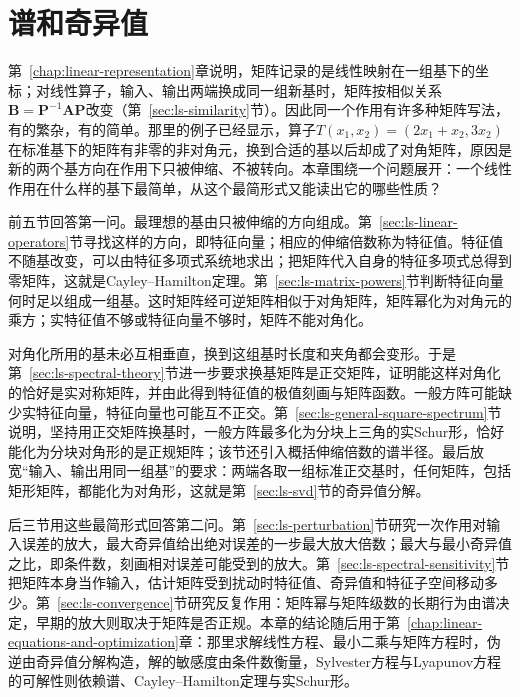 \chapter{谱和奇异值}
\label{chap:linear-analysis}
\label{chap:matrix-analysis}

第~\ref{chap:linear-representation}章说明，矩阵记录的是线性映射在一组基下的坐标；对线性算子，输入、输出两端换成同一组新基时，矩阵按相似关系$\bm B=\bm P^{-1}\bm A\bm P$改变（第~\ref{sec:ls-similarity}节）。因此同一个作用有许多种矩阵写法，有的繁杂，有的简单。那里的例子已经显示，算子$T(x_1,x_2)=(2x_1+x_2,3x_2)$在标准基下的矩阵有非零的非对角元，换到合适的基以后却成了对角矩阵，原因是新的两个基方向在作用下只被伸缩、不被转向。本章围绕一个问题展开：一个线性作用在什么样的基下最简单，从这个最简形式又能读出它的哪些性质？

前五节回答第一问。最理想的基由只被伸缩的方向组成。第~\ref{sec:ls-linear-operators}节寻找这样的方向，即特征向量；相应的伸缩倍数称为特征值。特征值不随基改变，可以由特征多项式系统地求出；把矩阵代入自身的特征多项式总得到零矩阵，这就是Cayley--Hamilton定理。第~\ref{sec:ls-matrix-powers}节判断特征向量何时足以组成一组基。这时矩阵经可逆矩阵相似于对角矩阵，矩阵幂化为对角元的乘方；实特征值不够或特征向量不够时，矩阵不能对角化。

对角化所用的基未必互相垂直，换到这组基时长度和夹角都会变形。于是第~\ref{sec:ls-spectral-theory}节进一步要求换基矩阵是正交矩阵，证明能这样对角化的恰好是实对称矩阵，并由此得到特征值的极值刻画与矩阵函数。一般方阵可能缺少实特征向量，特征向量也可能互不正交。第~\ref{sec:ls-general-square-spectrum}节说明，坚持用正交矩阵换基时，一般方阵最多化为分块上三角的实Schur形，恰好能化为分块对角形的是正规矩阵；该节还引入概括伸缩倍数的谱半径。最后放宽“输入、输出用同一组基”的要求：两端各取一组标准正交基时，任何矩阵，包括矩形矩阵，都能化为对角形，这就是第~\ref{sec:ls-svd}节的奇异值分解。

后三节用这些最简形式回答第二问。第~\ref{sec:ls-perturbation}节研究一次作用对输入误差的放大，最大奇异值给出绝对误差的一步最大放大倍数；最大与最小奇异值之比，即条件数，刻画相对误差可能受到的放大。第~\ref{sec:ls-spectral-sensitivity}节把矩阵本身当作输入，估计矩阵受到扰动时特征值、奇异值和特征子空间移动多少。第~\ref{sec:ls-convergence}节研究反复作用：矩阵幂与矩阵级数的长期行为由谱决定，早期的放大则取决于矩阵是否正规。本章的结论随后用于第~\ref{chap:linear-equations-and-optimization}章：那里求解线性方程、最小二乘与矩阵方程时，伪逆由奇异值分解构造，解的敏感度由条件数衡量，Sylvester方程与Lyapunov方程的可解性则依赖谱、Cayley--Hamilton定理与实Schur形。

